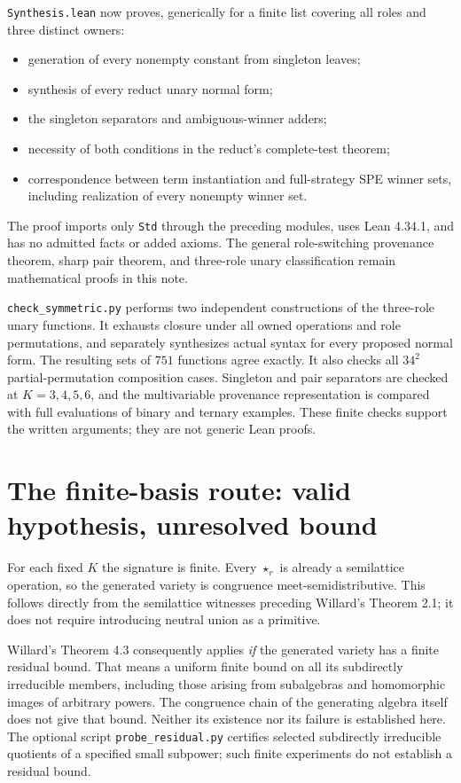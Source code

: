 \documentclass[11pt]{article}
\begin{document}
\texttt{Synthesis.lean} now proves, generically for a finite list covering
all roles and three distinct owners:
\begin{itemize}
\item generation of every nonempty constant from singleton leaves;
\item synthesis of every reduct unary normal form;
\item the singleton separators and ambiguous-winner adders;
\item necessity of both conditions in the reduct's complete-test theorem;
\item correspondence between term instantiation and full-strategy SPE
winner sets, including realization of every nonempty winner set.
\end{itemize}
The proof imports only \texttt{Std} through the preceding modules, uses
Lean 4.34.1, and has no admitted facts or added axioms. The general
role-switching provenance theorem, sharp pair theorem, and
three-role unary classification remain mathematical proofs in this note.

\texttt{check\_symmetric.py} performs two independent constructions of
the three-role unary functions. It exhausts closure under all owned
operations and role permutations, and separately synthesizes actual
syntax for every proposed normal form. The resulting sets of $751$
functions agree exactly. It also checks all $34^2$ partial-permutation
composition cases. Singleton and pair separators are checked at
$K=3,4,5,6$, and the multivariable provenance representation is compared
with full evaluations of binary and ternary examples. These finite
checks support the written arguments; they are not generic Lean proofs.

\section{The finite-basis route: valid hypothesis, unresolved bound}

For each fixed $K$ the signature is finite. Every $\star_r$ is already
a semilattice operation, so the generated variety is congruence
meet-semidistributive. This follows directly from the semilattice
witnesses preceding Willard's Theorem 2.1\cite{Willard2000}; it does not
require introducing neutral union as a primitive.

Willard's Theorem 4.3 consequently applies \emph{if} the generated
variety has a finite residual bound. That means a uniform finite bound
on all its subdirectly irreducible members, including those arising
from subalgebras and homomorphic images of arbitrary powers. The
congruence chain of the generating algebra itself does not give that
bound. Neither its existence nor its failure is established here. The
optional script \texttt{probe\_residual.py} certifies selected
subdirectly irreducible quotients of a specified small subpower; such
finite experiments do not establish a residual bound.
\end{document}
